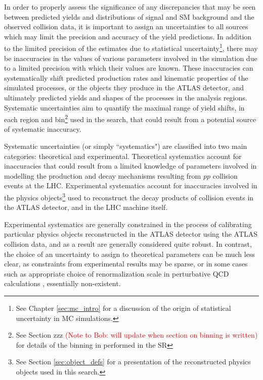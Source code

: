 \label{chapter:systematics}

In order to properly assess the significance of any discrepancies that may be seen between predicted yields and distributions of signal and SM background and the observed collision data, it is important to assign an uncertainties to all sources which may limit the precision and accuracy of the yield predictions. In addition to the limited precision of the estimates due to statistical uncertainty\footnote{See Chapter \ref{sec:mc_intro} for a discussion of the origin of statistical uncertainty in MC simulations.}, there may be inaccuracies in the values of various parameters involved in the simulation due to a limited precision with which their values are known. These inaccuracies can systematically shift predicted production rates and kinematic properties of the simulated processes, or the objects they produce in the ATLAS detector, and ultimately predicted yields and shapes of the processes in the analysis regions. Systematic uncertainties aim to quantify the maximal range of yield shifts, in each region and bin\footnote{See Section zzz \textcolor{red}{(Note to Bob: will update when section on binning is written)} for details of the binning in \minms performed in the SR} used in the search, that could result from a potential source of systematic inaccuracy. 

Systematic uncertainties (or simply ``systematics") are classified into two main categories: theoretical and experimental. Theoretical systematics account for inaccuracies that could result from a limited knowledge of parameters involved in modelling the production and decay mechanisms resulting from \(pp\) collision events at the LHC. Experimental systematics account for inaccuracies involved in the physics objects\footnote{See Section \ref{sec:object_defs} for a presentation of the reconstructed physics objects used in this search.} used to reconstruct the decay products of collision events in the ATLAS detector, and in the LHC machine itself. 

Experimental systematics are generally constrained in the process of calibrating particular physics objects reconstructed in the ATLAS detector using the ATLAS collision data, and as a result are generally considered quite robust. In contrast, the choice of an uncertainty to assign to theoretical parameters can be much less clear, as constraints from experimental results may be sparse, or in some cases such as appropriate choice of renormalization scale in perturbative QCD calculations \cite{PDG_2018}, essentially non-existent. 


